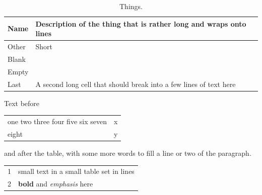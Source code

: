 \documentclass{article}
\begin{document}
\begin{table}[h]
\centering
\begin{tabular}{|l|p{3cm}|}
\hline
Name & Description of the thing that is rather long and wraps onto lines \\
\hline
Other & Short \\
Blank & \\
Empty & \\[4pt]
Last & A second long cell that should break into a few lines of text here \\
\hline
\end{tabular}
\caption{Things.}
\end{table}

Text before
\begin{tabular}[t]{@{: }p{2cm}@{ -- }c}
one two three four five six seven & x \\
eight & y
\end{tabular}
and after the table, with some more words to fill a line or two of the paragraph.

{\small
\begin{tabular}[b]{rp{25mm}@{}}
1 & small text in a small table set in lines \\
2 & \textbf{bold} and \emph{emphasis} here
\end{tabular}
}
\end{document}
